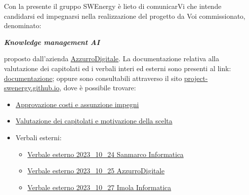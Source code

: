 Con la presente il gruppo SWEnergy è lieto di comunicarVi che intende candidarsi
ed impegnarsi nella realizzazione del progetto da Voi commissionato, denominato:

\begin{center}
\textbf{\textit{Knowledge management AI}}
\end{center}

proposto dall’azienda \href{https://www.azzurrodigitale.com/}{AzzurroDigitale}. 
La documentazione relativa alla valutazione dei capitolati ed i verbali
interi ed esterni sono presenti al link:
\href{https://github.com/Project-SWEnergy/documentazione}{documentazione};
oppure sono consultabili attraverso il sito 
\href{https://project-swenergy.github.io/}{project-swenergy.github.io},
dove è possibile trovare:

\begin{itemize}
	\item
		\href{https://github.com/Project-SWEnergy/documentazione/blob/main/Candidatura/Approvazione%20costi%20e%20assunzione%20impegni.pdf}{Approvazione costi e assunzione impegni}

	\item
		\href{https://github.com/Project-SWEnergy/documentazione/blob/main/Candidatura/Valutazione%20capitolati.pdf}{Valutazione dei capitolati e motivazione della scelta}
	
	\item Verbali esterni:
		\begin{itemize}
			\item
				\href{https://github.com/Project-SWEnergy/documentazione/blob/main/Candidatura/Verbali/Esterni/Verbale%20esterno%20-%202023_10_24%20Sanmarco.pdf}{Verbale esterno 2023\_10\_24 Sanmarco Informatica}
			\item
				\href{https://github.com/Project-SWEnergy/documentazione/blob/main/Candidatura/Verbali/Esterni/Verbale%20esterno%20-%202023_10_25%20AzzurroDigitale.pdf}{Verbale esterno 2023\_10\_25 AzzurroDigitale}
			\item
				\href{https://github.com/Project-SWEnergy/documentazione/blob/main/Candidatura/Verbali/Esterni/Verbale%20esterno%20-%202023_10_27%20Imola%20Informatica.pdf}{Verbale esterno 2023\_10\_27 Imola Informatica}
		\end{itemize}


\end{itemize}
